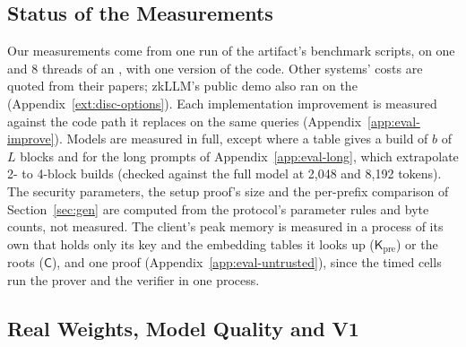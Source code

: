 \providecommand{\para}[1]{\par\noindent\textbf{#1}\quad}
\providecommand{\todo}[1]{\textbf{[TODO: #1]}}
\providecommand{\pviLoHi}[3]{\begingroup\expandafter\def\expandafter\pviLoHiA\expandafter{#1}%
  \expandafter\def\expandafter\pviLoHiB\expandafter{#2}\def\pviLoHiE{}%
  \ifx\pviLoHiA\pviLoHiB#1\else\ifx\pviLoHiB\pviLoHiE#1\else#1#3#2\fi\fi\endgroup}
\providecommand{\sC}{\mathsf{C}}
\providecommand{\sK}{\mathsf{K}}
\providecommand{\Kpre}{\mathsf{K}_{\mathrm{pre}}}

\subsection{Status of the Measurements}
\label{ext:disc-status}

Our measurements come from one run of the artifact's benchmark scripts, on one \PlatformGpu{}
and 8 threads of an \PlatformCpu{}, with one version of the code. Other systems' costs are quoted
from their papers; zkLLM's public demo also ran on the \PlatformGpu{} \ZkllmSameGpuRun{}
(Appendix~\ref{ext:disc-options}). Each implementation improvement is measured against the code
path it replaces on the same queries (Appendix~\ref{app:eval-improve}). Models are measured in full,
except where a table gives a build of $b$ of $L$ blocks and for the long prompts of
Appendix~\ref{app:eval-long}, which extrapolate 2- to 4-block builds (checked against the full model
at 2{,}048 and 8{,}192 tokens). The security parameters, the setup proof's size and the per-prefix
comparison of Section~\ref{sec:gen} are computed from the protocol's parameter rules and byte counts,
not measured. The
client's peak memory is measured in a process of its own that holds only its key and the embedding
tables it looks up ($\Kpre$) or the roots ($\sC$), and one proof (Appendix~\ref{app:eval-untrusted}),
since the timed cells run the prover and the verifier in one process.

\subsection{Real Weights, Model Quality and V1}
\label{ext:disc-real}

